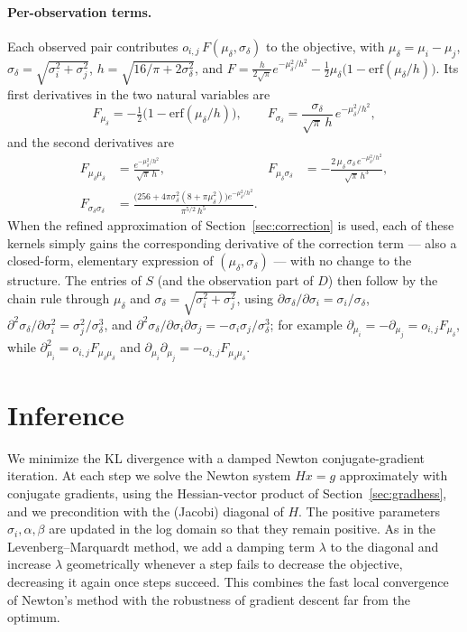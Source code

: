 \documentclass[12pt]{article}
\begin{document}
\paragraph{Per-observation terms.}
Each observed pair contributes $o_{i,j}\,F(\mu_\delta, \sigma_\delta)$ to the objective, with
$\mu_\delta = \mu_i - \mu_j$, $\sigma_\delta = \sqrt{\sigma_i^2 + \sigma_j^2}$,
$h = \sqrt{16/\pi + 2\sigma_\delta^2}$, and
$F = \frac{h}{2\sqrt\pi} e^{-\mu_\delta^2/h^2} - \tfrac{1}{2}\mu_\delta\bigl(1 - \mathrm{erf}(\mu_\delta/h)\bigr)$.
Its first derivatives in the two natural variables are
$$F_{\mu_\delta} = -\tfrac{1}{2}\bigl(1 - \mathrm{erf}(\mu_\delta/h)\bigr), \qquad
F_{\sigma_\delta} = \frac{\sigma_\delta}{\sqrt\pi\, h}\, e^{-\mu_\delta^2/h^2},$$
and the second derivatives are
\begin{align*}
    F_{\mu_\delta\mu_\delta} &= \frac{e^{-\mu_\delta^2/h^2}}{\sqrt\pi\, h}, &
    F_{\mu_\delta\sigma_\delta} &= -\frac{2\,\mu_\delta\,\sigma_\delta\, e^{-\mu_\delta^2/h^2}}{\sqrt\pi\, h^3}, \\
    F_{\sigma_\delta\sigma_\delta} &= \frac{\bigl(256 + 4\pi\sigma_\delta^2(8 + \pi\mu_\delta^2)\bigr) e^{-\mu_\delta^2/h^2}}{\pi^{5/2}\, h^5}. &
\end{align*}
When the refined approximation of Section~\ref{sec:correction} is used, each of these kernels simply
gains the corresponding derivative of the correction term --- also a closed-form, elementary expression
of $(\mu_\delta, \sigma_\delta)$ --- with no change to the structure.
The entries of $S$ (and the observation part of $D$) then follow by the chain rule through
$\mu_\delta$ and $\sigma_\delta = \sqrt{\sigma_i^2 + \sigma_j^2}$, using
$\partial\sigma_\delta/\partial\sigma_i = \sigma_i/\sigma_\delta$,
$\partial^2\sigma_\delta/\partial\sigma_i^2 = \sigma_j^2/\sigma_\delta^3$, and
$\partial^2\sigma_\delta/\partial\sigma_i\partial\sigma_j = -\sigma_i\sigma_j/\sigma_\delta^3$; for
example $\partial_{\mu_i} = -\partial_{\mu_j} = o_{i,j}F_{\mu_\delta}$, while
$\partial_{\mu_i}^2 = o_{i,j}F_{\mu_\delta\mu_\delta}$ and
$\partial_{\mu_i}\partial_{\mu_j} = -o_{i,j}F_{\mu_\delta\mu_\delta}$.

\section{Inference}
\label{sec:inference}

We minimize the KL divergence with a damped Newton conjugate-gradient iteration. At each step
we solve the Newton system $H x = g$ approximately with conjugate gradients, using the
Hessian-vector product of Section~\ref{sec:gradhess}, and we precondition with the (Jacobi)
diagonal of $H$. The positive parameters $\sigma_i, \alpha, \beta$ are updated in the log
domain so that they remain positive. As in the Levenberg--Marquardt method, we add a damping
term $\lambda$ to the diagonal and increase $\lambda$ geometrically whenever a step fails to
decrease the objective, decreasing it again once steps succeed. This combines the fast local
convergence of Newton's method with the robustness of gradient descent far from the optimum.
\end{document}
